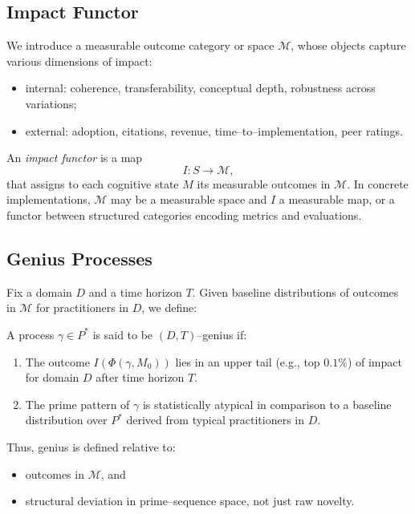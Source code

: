 \documentclass[11pt]{article}
\begin{document}
\subsection{Impact Functor}

We introduce a measurable outcome category or space $\mathcal{M}$, whose objects capture various dimensions of impact:
\begin{itemize}[nosep]
  \item internal: coherence, transferability, conceptual depth, robustness across variations;
  \item external: adoption, citations, revenue, time--to--implementation, peer ratings.
\end{itemize}

An \emph{impact functor} is a map
\[
I: S \to \mathcal{M},
\]
that assigns to each cognitive state $M$ its measurable outcomes in $\mathcal{M}$.
In concrete implementations, $\mathcal{M}$ may be a measurable space and $I$ a measurable map, or a functor between structured categories encoding metrics and evaluations.

\subsection{Genius Processes}

Fix a domain $D$ and a time horizon $T$.
Given baseline distributions of outcomes in $\mathcal{M}$ for practitioners in $D$, we define:

\begin{description}[style=unboxed,leftmargin=0cm]
  \item[Definition (Genius Process).]
  A process $\gamma\in P^\ast$ is said to be $(D,T)$--genius if:
  \begin{enumerate}[nosep]
    \item The outcome $I(\Phi(\gamma,M_0))$ lies in an upper tail (e.g., top $0.1\%$) of impact for domain $D$ after time horizon $T$.
    \item The prime pattern of $\gamma$ is statistically atypical in comparison to a baseline distribution over $P^\ast$ derived from typical practitioners in $D$.
  \end{enumerate}
\end{description}

Thus, genius is defined relative to:
\begin{itemize}[nosep]
  \item outcomes in $\mathcal{M}$, and
  \item structural deviation in prime--sequence space, not just raw novelty.
\end{itemize}
\end{document}
